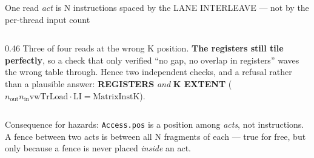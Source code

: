 \documentclass[aspectratio=169,9pt]{beamer}
\newcommand{\tsub}[1]{{\footnotesize\color{gray}#1}}
\newcommand{\key}[1]{\textcolor{acc}{\textbf{#1}}}
\newcommand{\bad}[1]{\textcolor{warn}{\textbf{#1}}}
\begin{document}
\begin{frame}{One read \emph{act} is N instructions spaced by the LANE INTERLEAVE --- not by the per-thread input count}
\begin{columns}[T]
\begin{column}{0.46\textwidth}
Three of four reads at the wrong K position. \bad{The registers still tile perfectly}, so a check that only
verified ``no gap, no overlap in registers'' waves the wrong table through. Hence two independent checks, and a
refusal rather than a plausible answer: \key{REGISTERS} \emph{and} \key{K EXTENT}
($n_{\mathrm{out}} n_{\mathrm{in}} \mathrm{vwTrLoad}\cdot\mathrm{LI} = \mathrm{MatrixInstK}$).
\end{column}
\end{columns}
\vspace{1mm}
\tsub{Consequence for hazards: \texttt{Access.pos} is a position among \emph{acts}, not instructions. A fence
between two acts is between all N fragments of each --- true for free, but only because a fence is never placed
\emph{inside} an act.}
\end{frame}
\end{document}
